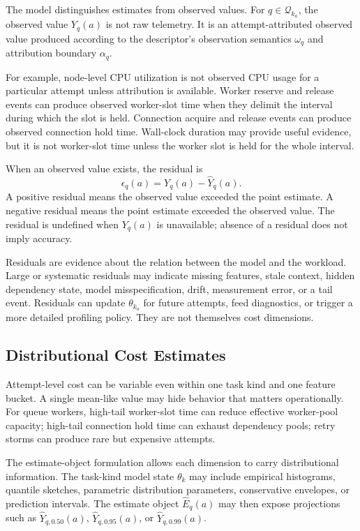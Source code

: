 The model distinguishes estimates from observed values. For
$q \in \mathcal{Q}_{k_a}$, the observed value $Y_q(a)$ is not raw telemetry. It
is an attempt-attributed observed value produced according to the descriptor's
observation semantics $\omega_q$ and attribution boundary $\alpha_q$.

For example, node-level CPU utilization is not observed CPU usage for a
particular attempt unless attribution is available. Worker reserve and release
events can produce observed worker-slot time when they delimit the interval
during which the slot is held. Connection acquire and release events can produce
observed connection hold time. Wall-clock duration may provide useful evidence,
but it is not worker-slot time unless the worker slot is held for the whole
interval.

When an observed value exists, the residual is
\[
\epsilon_q(a)
=
Y_q(a)
-
\widehat{Y}_q(a).
\]
A positive residual means the observed value exceeded the point estimate. A
negative residual means the point estimate exceeded the observed value. The
residual is undefined when $Y_q(a)$ is unavailable; absence of a residual does
not imply accuracy.

Residuals are evidence about the relation between the model and the workload.
Large or systematic residuals may indicate missing features, stale context,
hidden dependency state, model misspecification, drift, measurement error, or a
tail event. Residuals can update $\theta_{k_a}$ for future attempts, feed
diagnostics, or trigger a more detailed profiling policy. They are not
themselves cost dimensions.

\subsection{Distributional Cost Estimates}
\label{sec:cost-distributional-estimates}

Attempt-level cost can be variable even within one task kind and one feature
bucket. A single mean-like value may hide behavior that matters operationally.
For queue workers, high-tail worker-slot time can reduce effective worker-pool
capacity; high-tail connection hold time can exhaust dependency pools; retry
storms can produce rare but expensive attempts.

The estimate-object formulation allows each dimension to carry distributional
information. The task-kind model state $\theta_k$ may include empirical
histograms, quantile sketches, parametric distribution parameters, conservative
envelopes, or prediction intervals. The estimate object $\widehat{E}_q(a)$ may
then expose projections such as $\widehat{Y}_{q,0.50}(a)$,
$\widehat{Y}_{q,0.95}(a)$, or $\widehat{Y}_{q,0.99}(a)$.

